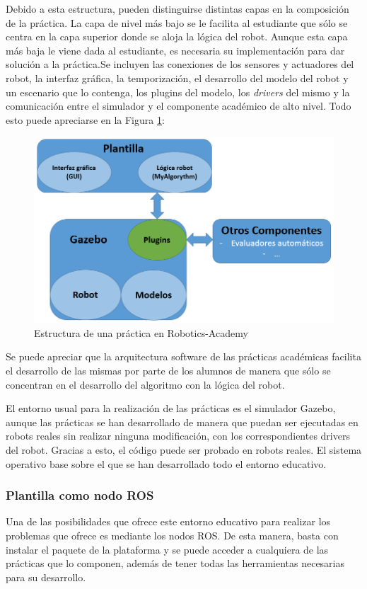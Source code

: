 Debido a esta estructura, pueden distinguirse distintas capas en la composición de la práctica. La capa de nivel más bajo se le facilita al estudiante que sólo se centra en la capa superior donde se aloja la lógica del robot. Aunque esta capa más baja le viene dada al estudiante, es necesaria su implementación para dar solución a la práctica.Se incluyen las conexiones de los sensores y actuadores del robot, la interfaz gráfica, la temporización, el desarrollo del modelo del robot y un escenario que lo contenga, los plugins del modelo, los \textit{drivers} del mismo y la comunicación entre el simulador y el componente académico de alto nivel. Todo esto puede apreciarse en la Figura \ref{fig.estructura}:

\begin{figure}[H]
  \begin{center}
    \includegraphics[width=0.9\linewidth]{figures/estructura_jde.png}
		\caption{Estructura de una práctica en Robotics-Academy}
		\label{fig.estructura}
		\end{center}
\end{figure}

Se puede apreciar que la arquitectura software de las prácticas académicas facilita el desarrollo de las mismas por parte de los alumnos de manera que sólo se concentran en el desarrollo del algoritmo con la lógica del robot.

El entorno usual para la realización de las prácticas es el simulador Gazebo, aunque las prácticas se han desarrollado de manera que puedan ser ejecutadas en robots reales sin realizar ninguna modificación, con los correspondientes drivers del robot. Gracias a esto, el código puede ser probado en robots reales. El sistema operativo base sobre el que se han desarrollado todo el entorno educativo.

\subsubsection{ Plantilla como nodo ROS}
Una de las posibilidades que ofrece este entorno educativo para realizar los problemas que ofrece es mediante los nodos ROS. De esta manera, basta con instalar el paquete de la plataforma y se puede acceder a cualquiera de las prácticas que lo componen, además de tener todas las herramientas necesarias para su desarrollo.

